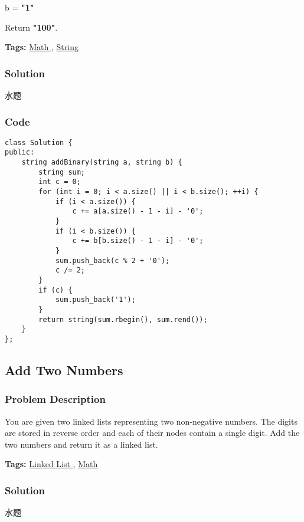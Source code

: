 \documentclass{article}
\begin{document}
\begin{CJK*}{UTF8}{gkai}
b = \textbf{"1"}


Return \textbf{"100"}.


\textbf{Tags: }
\hyperref[ Math ]{ Math },  \hyperref[ String ]{ String }



\subsubsection*{Solution}
水题

\subsubsection*{Code}
\begin{lstlisting}
class Solution {
public:
    string addBinary(string a, string b) {
        string sum;
        int c = 0;
        for (int i = 0; i < a.size() || i < b.size(); ++i) {
            if (i < a.size()) {
                c += a[a.size() - 1 - i] - '0';
            }
            if (i < b.size()) {
                c += b[b.size() - 1 - i] - '0';
            }
            sum.push_back(c % 2 + '0');
            c /= 2;
        }
        if (c) {
            sum.push_back('1');
        }
        return string(sum.rbegin(), sum.rend());
    }
}; 
\end{lstlisting}


\subsection{ Add Two Numbers }
\label{ Add Two Numbers }

\subsubsection*{Problem Description}
You are given two linked lists representing two non-negative numbers. The digits are stored in reverse order and each of their nodes contain a single digit. Add the two numbers and return it as a linked list.


\textbf{Tags: }
\hyperref[ Linked List ]{ Linked List },  \hyperref[ Math ]{ Math }



\subsubsection*{Solution}
水题


\end{CJK*}
\end{document}
